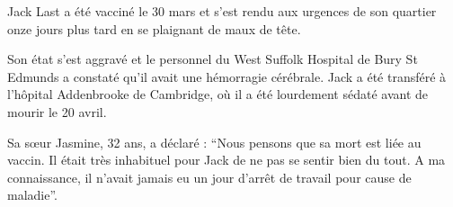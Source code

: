 Jack Last a été vacciné le 30 mars et s'est rendu aux urgences de son quartier
onze jours plus tard en se plaignant de maux de tête.

Son état s'est aggravé et le personnel du West Suffolk Hospital de Bury St
Edmunds a constaté qu'il avait une hémorragie cérébrale. Jack a été transféré à
l'hôpital Addenbrooke de Cambridge, où il a été lourdement sédaté avant de
mourir le 20 avril.

Sa sœur Jasmine, 32 ans, a déclaré : “Nous pensons que sa mort est liée au
vaccin. Il était très inhabituel pour Jack de ne pas se sentir bien du tout. A
ma connaissance, il n'avait jamais eu un jour d'arrêt de travail pour cause de
maladie”.


